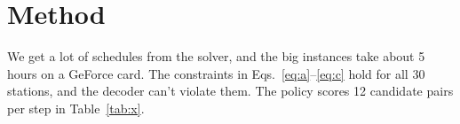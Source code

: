 \section{Method}

We get a lot of schedules from the solver, and the big instances take about 5 hours on a GeForce card.
The constraints in Eqs.~\eqref{eq:a}--\eqref{eq:c} hold for all 30 stations, and the decoder can't violate them.
The policy scores 12 candidate pairs per step in Table~\ref{tab:x}.
